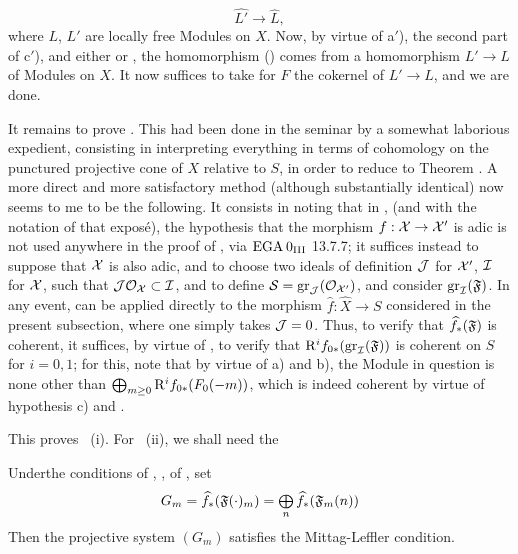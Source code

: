 \steco
\begin{equation} \label{eq:XII.18}
\widehat{L'} \to \widehat{L},
\end{equation}
where $L$, $L'$ are locally free Modules on $X$. Now, by virtue of a$'$), the second part of c$'$), and either  or , the homomorphism () comes from a homomorphism $L'\to L$ of Modules on $X$. It now suffices to take for $F$ the cokernel of $L'\to L$, and we are done.

It remains to prove . This had been done in the
seminar by a somewhat laborious expedient, consisting in interpreting
everything in terms of cohomology on the punctured projective cone
of $X$ relative to $S$, in order to reduce to
Theorem . A more direct and more
satisfactory method (although substantially identical) now seems to me
to be the following. It consists in noting that in ,
\numero {}\label{XII.14} (and with the
notation of that expos\'e), the hypothesis that the morphism
$f:\mathcal X\to\mathcal X'$ is adic is not used anywhere in the
proof of , via $\textup{EGA}\kern.2em 0_{\textup{III}}$ 13.7.7;
it suffices instead to suppose that $\mathcal X$ is also adic,
and to choose two ideals of definition $\mathcal J$ for $\mathcal X'$, $\mathcal I$
for $\mathcal X$, such that $\mathcal J\mathcal O_\mathcal X\subset\mathcal I$, and to define
$\mathcal S=\operatorname{gr}_\mathcal J(\mathcal O_{\mathcal X'})$, and consider $\operatorname{gr}_\mathcal I(\mathfrak F)$. In
any event,  can be applied directly to the
morphism $\widehat{f}:\widehat{X}\to S$ considered in the present
subsection, where one simply takes $\mathcal J=0$. Thus, to verify that
$\widehat{f}_\ast(\mathfrak F)$ is coherent, it suffices, by virtue of
\loccit, to verify that $\mathrm R^if_{0\ast}(\operatorname{gr}_\mathcal I(\mathfrak F))$ is
coherent on $S$ for $i=0, 1$; for this, note that by virtue of
a) and b), the Module in question is none other than
$\bigoplus_{m\geq 0}\mathrm R^if_{0\ast}(F_0(-m))$, which
is indeed coherent by virtue of hypothesis c) and
.

This proves ~(i). For ~(ii), we shall need the

\begin{lemme} \label{XII.3.3}
Under\pageoriginaled the conditions of , ,  of , set
\[
G_m= \widehat{f}_\ast(\mathfrak F(\cdot)_m) = \mathop{\textstyle\bigoplus}\limits_n\widehat{f}_\ast(\mathfrak F_m(n))
\]
Then the projective system $(G_m)$ satisfies the Mittag-Leffler condition.
\end{lemme}

